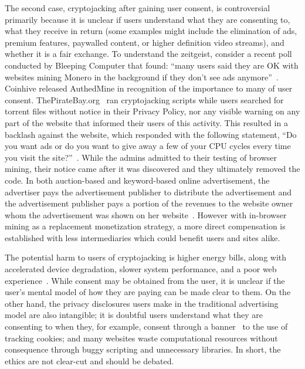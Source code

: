 The second case, cryptojacking after gaining user consent, is controversial primarily because it is unclear if users understand what they are consenting to, what they receive in return (some examples might include the elimination of ads, premium features, paywalled content, or higher definition video streams), and whether it is a fair exchange. To understand the zeitgeist, consider a recent poll conducted by Bleeping Computer that found: ``many users said they are OK with websites mining Monero in the background if they don't see ads anymore''~\cite{bleepingcomputerminers}. Coinhive released AuthedMine in recognition of the importance to many of user consent. ThePirateBay.org~\cite{bbcmintcrypto} ran cryptojacking scripts while users searched for torrent files without notice in their Privacy Policy, nor any visible warning on any part of the website that informed their users of this activity. This resulted in a backlash against the website, which responded with the following statement, ``Do you want ads or do you want to give away a few of your CPU cycles every time you visit the site?''~\cite{piratesbayblog}. While the admins admitted to their testing of browser mining, their notice came after it was discovered and they ultimately removed the code. In both auction-based and keyword-based online advertisement, the advertiser pays the advertisement publisher to distribute the advertisement and the advertisement publisher pays a portion of the revenues to the website owner whom the advertisement was shown on her website~\cite{king2007internet}. However with in-browser mining as a replacement monetization strategy, a more direct compensation is established with less intermediaries which could benefit users and sites alike. 

The potential harm to users of cryptojacking is higher energy bills, along with accelerated device degradation, slower system performance, and a poor web experience~\cite{httparchiveminingimpact,gaurdianelectricity}. While consent may be obtained from the user, it is unclear if the user's mental model of how they are paying can be made clear to them. On the other hand, the privacy disclosures users make in the traditional advertising model are also intangible; it is doubtful users understand what they are consenting to when they, for example, consent through a banner~\cite{eucookie} to the use of tracking cookies; and many websites waste computational resources without consequence through buggy scripting and unnecessary libraries. In short, the ethics are not clear-cut and should be debated. 

